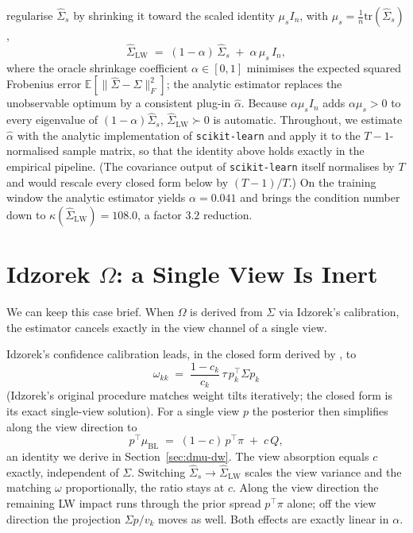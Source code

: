 \documentclass[a4paper,11pt]{article}
\theoremstyle{plain}
\theoremstyle{definition}
\newcommand{\E}{\mathbb{E}}
\newcommand{\muBL}{\mu_{\mathrm{BL}}}
\newcommand{\LW}{\mathrm{LW}}
\begin{document}
\citet{LedoitWolf2004} regularise $\hat\Sigma_s$ by shrinking it toward
the scaled identity $\mu_s I_n$, with
$\mu_s = \tfrac{1}{n}\mathrm{tr}(\hat\Sigma_s)$,
\[
  \hat\Sigma_{\LW} \;=\; (1-\alpha)\,\hat\Sigma_s \;+\; \alpha\,\mu_s\,I_n,
\]
where the oracle shrinkage coefficient $\alpha\in[0,1]$ minimises the
expected squared Frobenius error $\E[\|\hat\Sigma - \Sigma\|_F^2]$; the
analytic estimator replaces the unobservable optimum by a consistent
plug-in $\hat\alpha$. Because $\alpha\mu_s I_n$ adds $\alpha\mu_s>0$ to
every eigenvalue of $(1-\alpha)\hat\Sigma_s$, $\hat\Sigma_{\LW}\succ 0$
is automatic. Throughout, we estimate $\hat\alpha$ with the analytic
implementation of \texttt{scikit-learn} and apply it to the
$T-1$-normalised sample matrix, so that the identity above holds exactly
in the empirical pipeline. (The covariance output of
\texttt{scikit-learn} itself normalises by $T$ and would rescale every
closed form below by $(T-1)/T$.) On the training window the analytic
estimator yields $\alpha = 0.041$ and brings the condition number down
to $\kappa(\hat\Sigma_{\LW}) = 108.0$, a factor $3.2$ reduction.

\section{Idzorek $\Omega$: a Single View Is Inert}
\label{sec:idzorek-cancel}

We can keep this case brief. When $\Omega$ is derived from $\Sigma$ via
Idzorek's calibration, the estimator cancels exactly in the view channel
of a single view.

Idzorek's confidence calibration leads, in the closed form derived by
\citet{Walters2014}, to
\[
  \omega_{kk} \;=\; \frac{1-c_k}{c_k}\,\tau\,p_k^\top\Sigma p_k
\]
(Idzorek's original procedure matches weight tilts iteratively; the
closed form is its exact single-view solution). For a single view $p$
the posterior then simplifies along the view direction to
\[
  p^\top\muBL \;=\; (1 - c)\,p^\top\pi \;+\; c\,Q,
\]
an identity we derive in Section~\ref{sec:dmu-dw}. The view absorption
equals $c$ exactly, independent of $\Sigma$. Switching
$\hat\Sigma_s \to \hat\Sigma_{\LW}$ scales the view variance and the
matching $\omega$ proportionally, the ratio stays at $c$. Along the view
direction the remaining LW impact runs through the prior spread
$p^\top\pi$ alone; off the view direction the projection
$\Sigma p / v_k$ moves as well. Both effects are exactly linear in
$\alpha$.
\end{document}
